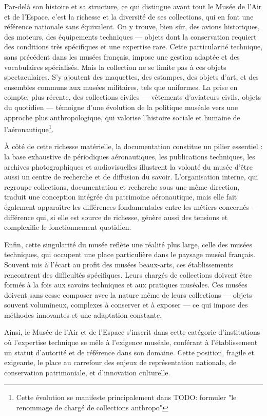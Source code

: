 Par-delà son histoire et sa structure, ce qui distingue avant tout le Musée de l’Air et de l’Espace, c’est la richesse et la diversité de ses collections, qui en font une référence nationale sans équivalent. On y trouve, bien sûr, des avions historiques, des moteurs, des équipements techniques — objets dont la conservation requiert des conditions très spécifiques et une expertise rare. Cette particularité technique, sans précédent dans les musées français, impose une gestion adaptée et des vocabulaires spécialisés. Mais la collection ne se limite pas à ces objets spectaculaires. S’y ajoutent des maquettes, des estampes, des objets d’art, et des ensembles communs aux musées militaires, tels que uniformes. La prise en compte, plus récente, des collections civiles — vêtements d’aviateurs civils, objets du quotidien — témoigne d’une évolution de la politique muséale vers une approche plus anthropologique, qui valorise l’histoire sociale et humaine de l’aéronautique\footnote{Cette évolution se manifeste principalement dans TODO: formuler "le renommage de chargé de collections anthropo"}.

À côté de cette richesse matérielle, la documentation constitue un pilier essentiel : la base exhaustive de périodiques aéronautiques, les publications techniques, les archives photographiques et audiovisuelles illustrent la volonté du musée d’être aussi un centre de recherche et de diffusion du savoir. L’organisation interne, qui regroupe collections, documentation et recherche sous une même direction, traduit une conception intégrée du patrimoine aéronautique, mais elle fait également apparaître les différences fondamentales entre les métiers concernés — différence qui, si elle est source de richesse, génère aussi des tensions et complexifie le fonctionnement quotidien.

Enfin, cette singularité du musée reflète une réalité plus large, celle des musées techniques, qui occupent une place particulière dans le paysage muséal français. Souvent mis à l’écart au profit des musées beaux-arts, ces établissements rencontrent des difficultés spécifiques. Leurs chargés de collections doivent être formés à la fois aux savoirs techniques et aux pratiques muséales. Ces musées doivent sans cesse composer avec la nature même de leurs collections — objets souvent volumineux, complexes à conserver et à exposer — ce qui impose des méthodes innovantes et une adaptation constante.

Ainsi, le Musée de l’Air et de l’Espace s’inscrit dans cette catégorie d’institutions où l’expertise technique se mêle à l’exigence muséale, conférant à l’établissement un statut d’autorité et de référence dans son domaine. Cette position, fragile et exigeante, le place au carrefour des enjeux de représentation nationale, de conservation patrimoniale, et d’innovation culturelle.
